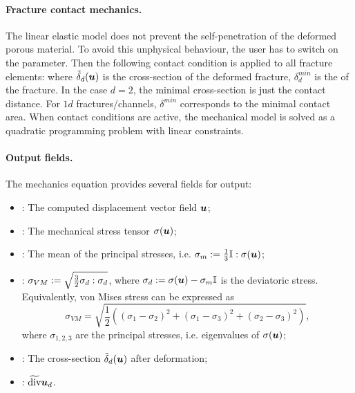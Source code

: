 \paragraph{Fracture contact mechanics.}
The linear elastic model does not prevent the self-penetration of the deformed porous material.
To avoid this unphysical behaviour, the user has to switch on the  parameter.
Then the following contact condition is applied to all fracture elements:
where $\tilde\delta_d(\mathbf{\boldsymbol{u}})$  is the cross-section of the deformed fracture, $\delta_d^{min}$  is the  of the fracture.
In the case $d=2$, the minimal cross-section is just the contact distance.
For $1d$ fractures/channels, $\delta^{min}$ corresponds to the minimal contact area.
When contact conditions are active, the mechanical model is solved as a quadratic programming problem with linear constraints.

\paragraph{Output fields.}
The mechanics equation provides several fields for output:
\begin{itemize}
    \item {}: The computed displacement vector field $\mathbf{\boldsymbol{u}}$;
    \item {}: The mechanical stress tensor ${\mathbb{\sigma}}(\mathbf{\boldsymbol{u}})$;
    \item {}: The mean of the principal stresses, i.e. $\sigma_m:=\frac13{\mathbb{I}}:{\mathbb{\sigma}}(\mathbf{\boldsymbol{u}})$;
    \item {}: $\sigma_{VM}:=\sqrt{\frac32{\mathbb{\sigma}}_d:{\mathbb{\sigma}}_d}$, where ${\mathbb{\sigma}}_d:={\mathbb{\sigma}}(\mathbf{\boldsymbol{u}})-\sigma_m{\mathbb{I}}$ is the deviatoric stress.
    Equivalently, von Mises stress can be expressed as
    \[ \sigma_{VM} = \sqrt{\frac12\left((\sigma_1-\sigma_2)^2+(\sigma_1-\sigma_3)^2+(\sigma_2-\sigma_3)^2\right)}, \]
    where $\sigma_{1,2,3}$ are the principal stresses, i.e. eigenvalues of ${\mathbb{\sigma}}(\mathbf{\boldsymbol{u}})$;
    \item {}: The cross-section $\tilde\delta_d(\mathbf{\boldsymbol{u}})$ after deformation;
    \item {}: $\widetilde{\operatorname{div}}\mathbf{\boldsymbol{u}}_d$.
\end{itemize}


